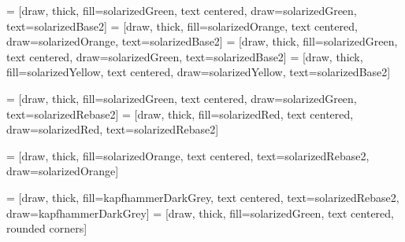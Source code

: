  = [draw, thick, fill=solarizedGreen, text centered, draw=solarizedGreen,
    text=solarizedBase2]
 = [draw, thick, fill=solarizedOrange, text centered, draw=solarizedOrange,
    text=solarizedBase2]
 = [draw, thick, fill=solarizedGreen, text centered, draw=solarizedGreen,
    text=solarizedBase2]
 = [draw, thick, fill=solarizedYellow, text centered, draw=solarizedYellow,
    text=solarizedBase2]

 = [draw, thick, fill=solarizedGreen, text centered, draw=solarizedGreen, text=solarizedRebase2]
 = [draw, thick, fill=solarizedRed, text centered, draw=solarizedRed, text=solarizedRebase2]

 = [draw, thick, fill=solarizedOrange, text centered, text=solarizedRebase2, draw=solarizedOrange]

 = [draw, thick, fill=kapfhammerDarkGrey, text centered, text=solarizedRebase2, draw=kapfhammerDarkGrey]
 = [draw, thick, fill=solarizedGreen, text centered, rounded corners]
